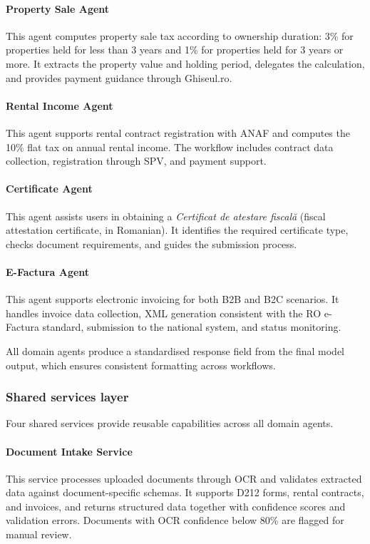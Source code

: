 \documentclass[3p,times,procedia]{elsarticle}
\begin{document}
\paragraph{Property Sale Agent}
This agent computes property sale tax according to ownership duration: 3\% for properties held for less than 3 years and 1\% for properties held for 3 years or more. It extracts the property value and holding period, delegates the calculation, and provides payment guidance through Ghiseul.ro.

\paragraph{Rental Income Agent}
This agent supports rental contract registration with ANAF and computes the 10\% flat tax on annual rental income. The workflow includes contract data collection, registration through SPV, and payment support.

\paragraph{Certificate Agent}
This agent assists users in obtaining a \textit{Certificat de atestare fiscal\u{a}} (fiscal attestation certificate, in Romanian). It identifies the required certificate type, checks document requirements, and guides the submission process.

\paragraph{E-Factura Agent}
This agent supports electronic invoicing for both B2B and B2C scenarios. It handles invoice data collection, XML generation consistent with the RO e-Factura standard, submission to the national system, and status monitoring.

All domain agents produce a standardised response field from the final model output, which ensures consistent formatting across workflows.

\subsubsection{Shared services layer}
\label{subsubsec:shared}

Four shared services provide reusable capabilities across all domain agents.

\paragraph{Document Intake Service}
This service processes uploaded documents through OCR and validates extracted data against document-specific schemas. It supports D212 forms, rental contracts, and invoices, and returns structured data together with confidence scores and validation errors. Documents with OCR confidence below 80\% are flagged for manual review.
\end{document}
